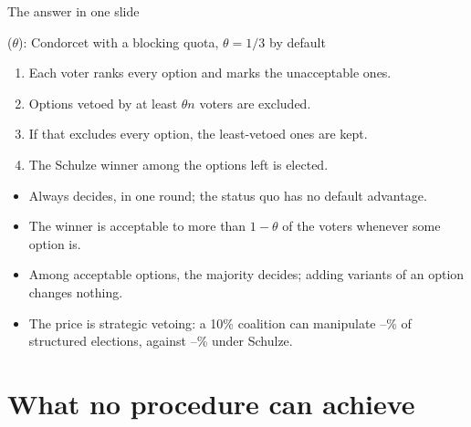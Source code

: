 \documentclass[10pt,aspectratio=169]{beamer}
\begin{document}
\begin{frame}{The answer in one slide}
  \begin{block}{\QVC($\theta$): Condorcet with a blocking quota, $\theta = 1/3$ by default}
    \begin{enumerate}
      \item Each voter ranks every option and marks the unacceptable ones.
      \item Options vetoed by at least $\theta n$ voters are excluded.
      \item If that excludes every option, the least-vetoed ones are kept.
      \item The Schulze winner among the options left is elected.
    \end{enumerate}
  \end{block}
  \begin{itemize}
    \item Always decides, in one round; the status quo has no default advantage.
    \item The winner is acceptable to more than $1-\theta$ of the voters whenever some option is.
    \item Among acceptable options, the majority decides; adding variants of an option changes nothing.
    \item \alert{The price is strategic vetoing}: a 10\% coalition can manipulate
      \KNmanipQVCSpatial--\KNmanipQVCPolarised\% of structured elections, against
      \KNmanipSchulzeSpatial--\KNmanipSchulzePolarised\% under Schulze.
  \end{itemize}
\end{frame}

\section{What no procedure can achieve}
\end{document}
